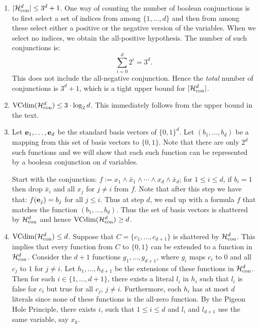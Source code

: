 \begin{enumerate}
    \item $|\mathcal{H}_{\text{con}}^{d}| \leq 3^d + 1$. One way of counting the number of boolean 
        conjunctions is to first select a set of indices from among 
        $\{1, \ldots, d\}$ and then from among these select either a positive 
        or the negative version of the variables. When we select no indices, 
        we obtain the all-positive hypothesis. The number of such conjunctions
        is:
        \[
                \sum_{i = 0}^{d} 2^i = 3^d.
        \] 
        This does not include the all-negative conjunction. Hence the \emph{total}
        number of conjunctions is $3^d + 1$, which is a tight upper  bound for 
        $|\mathcal{H}_{\text{con}}^{d}|$.

    \item $\text{VCdim} (\mathcal{H}_{\text{con}}^{d}) \leq 3 \cdot \log_2 d$. This immediately follows 
        from the upper bound in the text.

    \item Let $\mathbf{e}_1, \ldots, \mathbf{e}_d$ be the standard basis vectors of
        $\{0, 1\}^d$. Let $(b_1, \ldots, b_d)$ be a mapping from this set of 
        basis vectors to $\{0, 1\}$. Note that there are only $2^d$ such functions 
        and we will show that each such function can be represented by a 
        boolean conjunction on $d$ variables. 
    
        Start with the conjunction: $f := x_1 \wedge \bar{x}_1 \wedge 
        \cdots \wedge x_{d} \wedge \bar{x}_d$; for $1 \leq i \leq d$, 
        if $b_i = 1$ then drop $\bar{x}_i$ and all $x_j$ for $j \neq i$ from $f$. 
        Note that after this step we have that: $f(\mathbf{e}_j) = b_j$ for all $j \leq i$.
        Thus at step $d$, we end up with a formula $f$ that matches the function 
        $(b_1, \ldots, b_d)$.
        Thus the set of basis vectors is shattered by $\mathcal{H}_{\text{con}}^{d}$ and 
        hence $\text{VCdim} (\mathcal{H}_{\text{con}}^{d}) \geq d$.

    \item $\text{VCdim} (\mathcal{H}_{\text{con}}^{d}) \leq d$. Suppose that $C = \{c_1, \ldots, c_{d + 1}\}$
        is shattered by $\mathcal{H}_{\text{con}}^{d}$. This implies that every function from $C$ to 
        $\{0, 1\}$ can be extended to a function in $\mathcal{H}_{\text{con}}^{d}$. Consider the 
        $d + 1$ functions $g_1, \ldots, g_{d + 1}$, where $g_i$ maps $c_i$ to $0$ 
        and all $c_j$ to $1$ for $j \neq i$. Let $h_1, \ldots, h_{d + 1}$ be the 
        extensions of these functions in $\mathcal{H}_{\text{con}}^{d}$. Then for each $i \in 
        \{1, \ldots, d+ 1\}$, there exists a literal $l_i$ in $h_i$ such that 
        $l_i$ is false for $c_i$ but true for all $c_j$, $j \neq i$. Furthermore, 
        each $h_i$ has at most $d$ literals since none of these functions is  
        the all-zero function. By the Pigeon Hole Principle, there exists $i$, 
        such that $1 \leq i \leq d$ and $l_i$ and $l_{d + 1}$ use the same variable, 
        say $x_k$. 


\end{enumerate}
